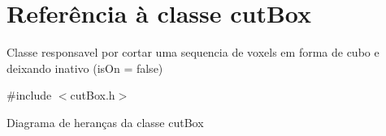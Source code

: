 \hypertarget{classcut_box}{}\section{Referência à classe cut\+Box}
\label{classcut_box}


Classe responsavel por cortar uma sequencia de voxels em forma de cubo e deixando inativo (is\+On = false)  




{\ttfamily \#include $<$cut\+Box.\+h$>$}



Diagrama de heranças da classe cut\+Box
